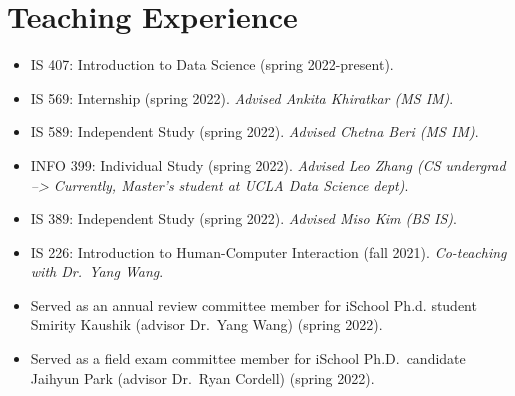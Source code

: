 \documentclass[11pt,a4paper,]{awesome-cv}
\begin{document}
\begin{cventries}
\end{cventries}

\hypertarget{teaching-experience}{%
  \section{Teaching Experience}\label{teaching-experience}}

\begin{itemize}
  \item
        IS 407: Introduction to Data Science (spring 2022-present).
  \item
        IS 569: Internship (spring 2022). \emph{Advised Ankita Khiratkar (MS
          IM)}.
  \item
        IS 589: Independent Study (spring 2022). \emph{Advised Chetna Beri (MS
          IM)}.
  \item
        INFO 399: Individual Study (spring 2022). \emph{Advised Leo Zhang (CS
          undergrad --\textgreater{} Currently, Master's student at UCLA Data
          Science dept)}.
  \item
        IS 389: Independent Study (spring 2022). \emph{Advised Miso Kim (BS
          IS)}.
  \item
        IS 226: Introduction to Human-Computer Interaction (fall 2021).
        \emph{Co-teaching with Dr.~Yang Wang}.
  \item
        Served as an annual review committee member for iSchool Ph.d. student
        Smirity Kaushik (advisor Dr.~Yang Wang) (spring 2022).
  \item
        Served as a field exam committee member for iSchool Ph.D.~candidate
        Jaihyun Park (advisor Dr.~Ryan Cordell) (spring 2022).
\end{itemize}
\end{document}
